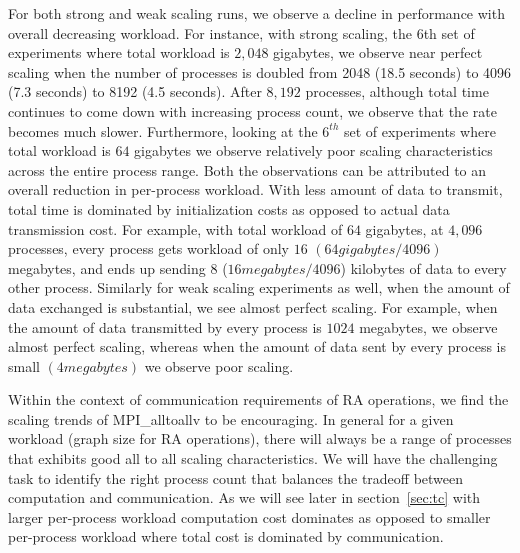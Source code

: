 For both strong and weak scaling runs, we observe a decline in performance with overall decreasing workload. For instance, with strong scaling, the 6th set of experiments where total workload is $2,048$ gigabytes, we observe near perfect scaling when the number of processes is doubled from 2048 (18.5 seconds) to 4096 (7.3 seconds) to 8192 (4.5 seconds). After $8,192$ processes, although total time continues to come down with increasing process count, we observe that the rate becomes much slower. Furthermore, looking at the $6^{th}$ set of experiments where total workload is $64$ gigabytes we observe relatively poor scaling characteristics across the entire process range. Both the observations can be attributed to an overall reduction in per-process workload. With less amount of data to transmit, total time is dominated by initialization costs as opposed to actual data transmission cost. For example, with total workload of $64$ gigabytes, at $4,096$ processes, every process gets workload of only $16$ $(64 gigabytes / 4096)$ megabytes, and ends up sending $8$ ($16 megabytes / 4096$) kilobytes of data to every other process. Similarly for weak scaling experiments as well, when the amount of data exchanged is substantial, we see almost perfect scaling. For example, when the amount of data transmitted by every process is $1024$ megabytes, we observe almost perfect scaling, whereas when the amount of data sent by every process is small $(4 megabytes)$ we observe poor scaling.


Within the context of communication requirements of RA operations, we find the scaling trends of MPI\_alltoallv to be encouraging. In general for a given workload (graph size for RA operations), there will always be a range of processes that exhibits good all to all scaling characteristics. We will have the challenging task to identify the right process count that balances the tradeoff between computation and communication. As we will see later in section~\ref{sec:tc} with larger per-process workload computation cost dominates as opposed to smaller per-process workload where total cost is dominated by communication. 


